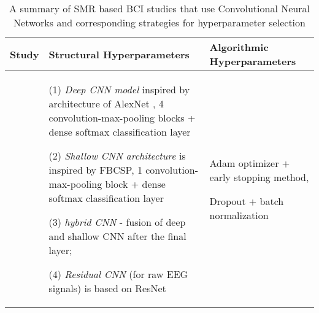 \documentclass{ieeeaccess}
\begin{document}
        
    \begin{table*} 
        \caption{A summary of SMR based BCI studies that use Convolutional Neural Networks and corresponding strategies for hyperparameter selection} 
        \setlength{\tabcolsep}{10pt} 
        \begin{tabular}{|p{0.6cm}|p{9cm}|p{5cm}|}\hline
            \textbf{\textbf{Study}} &  \textbf{Structural Hyperparameters} &  \textbf{Algorithmic Hyperparameters}  \\\hline
            
            \cite{schirrmeister2017deep}& (1) \textit{Deep CNN model} inspired by architecture of AlexNet \cite{krizhevsky2012imagenet}, 4 convolution-max-pooling blocks + dense softmax classification layer %
            \par
            (2) \textit{Shallow CNN architecture} is inspired by FBCSP, 1 convolution-max-pooling block + dense softmax classification layer %
            \par
            (3) \textit{hybrid CNN} - fusion of deep and shallow CNN after the final layer; \par
            (4) \textit{Residual CNN} (for raw EEG signals) is based on ResNet \cite{he2016deep} &  Adam optimizer + early stopping method,\par Dropout + batch normalization\\
            \hline
            

\end{tabular}
\end{table*}
\end{document}
